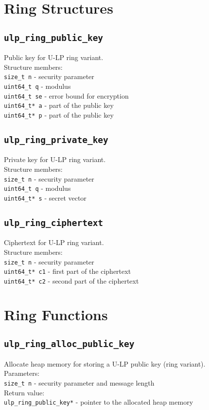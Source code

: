 \documentclass[10pt,a4paper]{article}
\begin{document}
\section*{Ring Structures}

\subsection*{\texttt{ulp\_ring\_public\_key}}
Public key for U-LP ring variant.\\
Structure members:\\
\texttt{size\_t n} - security parameter\\
\texttt{uint64\_t q} - modulus\\
\texttt{uint64\_t se} - error bound for encryption\\
\texttt{uint64\_t* a} - part of the public key\\
\texttt{uint64\_t* p} - part of the public key

\subsection*{\texttt{ulp\_ring\_private\_key}}
Private key for U-LP ring variant.\\
Structure members:\\
\texttt{size\_t n} - security parameter\\
\texttt{uint64\_t q} - modulus\\
\texttt{uint64\_t* s} - secret vector

\subsection*{\texttt{ulp\_ring\_ciphertext}}
Ciphertext for U-LP ring variant.\\
Structure members:\\
\texttt{size\_t n} - security parameter\\
\texttt{uint64\_t* c1} - first part of the ciphertext\\
\texttt{uint64\_t* c2} - second part of the ciphertext

\section*{Ring Functions}

\subsection*{\texttt{ulp\_ring\_alloc\_public\_key}}
Allocate heap memory for storing a U-LP public key (ring variant).\\
Parameters:\\
\texttt{size\_t n} - security parameter and message length\\
Return value:\\
\texttt{ulp\_ring\_public\_key*} - pointer to the allocated heap memory
\end{document}

